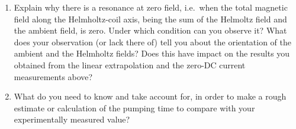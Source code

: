 \documentclass{../lab}
\begin{document}
\begin{enumerate}
    \item Explain why there is a resonance at zero field, i.e.\ when the total magnetic field along the Helmholtz-coil axis, being the sum of the Helmoltz field and the ambient field, is zero. Under which condition can you observe it? What does your observation (or lack there of) tell you about the orientation of the ambient and the Helmholtz fields? Does this have impact on the results you obtained from the linear extrapolation and the zero-DC current measurements above?

    \item What do you need to know and take account for, in order to make a rough estimate or calculation of the pumping time to compare with your experimentally measured value?

\end{enumerate}





\end{document}
